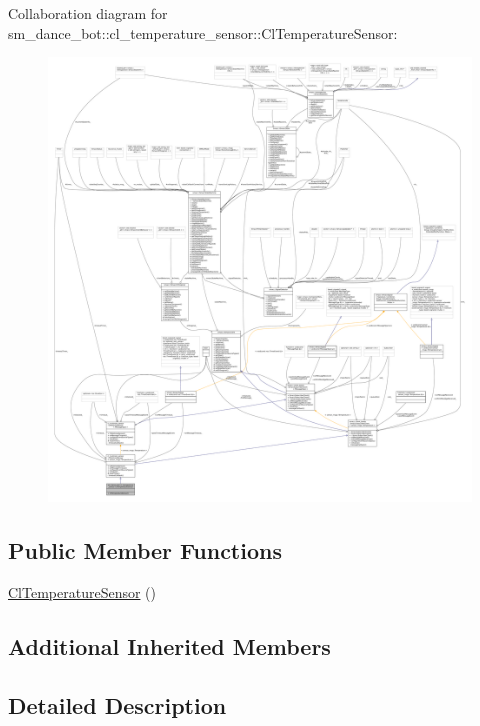Collaboration diagram for sm\+\_\+dance\+\_\+bot\+:\+:cl\+\_\+temperature\+\_\+sensor\+:\+:Cl\+Temperature\+Sensor\+:
\nopagebreak
\begin{figure}[H]
\begin{center}
\leavevmode
\includegraphics[width=350pt]{classsm__dance__bot_1_1cl__temperature__sensor_1_1ClTemperatureSensor__coll__graph}
\end{center}
\end{figure}
\subsection*{Public Member Functions}
\begin{DoxyCompactItemize}
\item 
\hyperlink{classsm__dance__bot_1_1cl__temperature__sensor_1_1ClTemperatureSensor_ac2e5d27f5110bc19393890214429d0bf}{Cl\+Temperature\+Sensor} ()
\end{DoxyCompactItemize}
\subsection*{Additional Inherited Members}


\subsection{Detailed Description}



